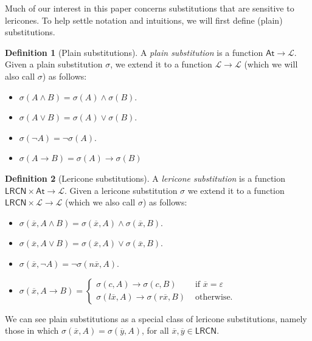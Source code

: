 \documentclass{amsart}
\theoremstyle{definition}
\newtheorem{mdef}{Definition}
\newcommand{\LL}{\mathcal{L}}
\newcommand{\At}{\mathsf{At}}
\newcommand{\LRCN}{\mathsf{LRCN}}
\begin{document}
Much of our interest in this paper concerns substitutions that are sensitive to lericones. 
To help settle notation and intuitions, we will first define (plain) substitutions.
\begin{mdef}[Plain substitutions]
A \emph{plain substitution} is a function $\At\to\LL$. Given a plain substitution $\sigma$, we extend it to a function $\LL\to\LL$ (which we will also call $\sigma$) as follows:
\begin{itemize}
    \item $\sigma(A\land B)=\sigma(A)\land\sigma(B)$.
    \item $\sigma(A\lor B)=\sigma(A)\lor\sigma(B)$.
    \item $\sigma(\neg A)=\neg\sigma(A)$.
    \item $\sigma(A\to B)=\sigma(A)\to\sigma(B)$
\end{itemize}
\end{mdef}
\begin{mdef}[Lericone substitutions]
A \emph{lericone substitution} is a function $\LRCN\times\At\to\LL$. Given a lericone substitution $\sigma$ we extend it to a function $\LRCN\times\LL\to\LL$ (which we also call $\sigma$) as follows:
\begin{itemize}
    \item $\sigma(\overline{x},A\land B)=\sigma(\overline{x},A)\land\sigma(\overline{x},B)$.
    \item $\sigma(\overline{x},A\lor B)=\sigma(\overline{x},A)\lor\sigma(\overline{x},B)$.
    \item $\sigma(\overline{x},\neg A)=\neg\sigma(n\overline{x},A)$.
    \item $\sigma(\overline{x},A\to B)=\left\{
        \begin{array}{rl}
            \sigma(c,A)\to\sigma(c,B) & \text{ if }\overline{x}=\varepsilon \\
            \sigma(l\overline{x},A)\to\sigma(r\overline{x},B) & \text{ otherwise}.
        \end{array}\right.$
\end{itemize}
\end{mdef}
\noindent We can see plain substitutions as a special class of lericone substitutions, namely those in which $\sigma(\overline{x}, A)=\sigma(\overline{y}, A)$, for all $\overline{x},\overline{y}\in\LRCN$.
\end{document}
